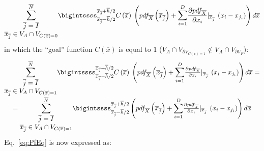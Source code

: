 \begin{equation}
\mathlarger{\sum}_{\begin{matrix}
\overline{j}=\overline{I} \\ \overline{x}_{\overline{j}} \in V_{A} \cap V_{C(\overline{x})=0} \end{matrix}}^{\overline{N}} 
\bigintssss_{\overline{x}_{\overline{j}} - \overline{h}/2}^{\overline{x}_{\overline{j}} + \overline{h}/2} C\left ( \overline{x} \right )\: 
\left ( pdf_{\overline{X}}\left ( \overline{x}_{\overline{j}} \right ) +
\mathlarger{\sum}_{i=1}^{D} \frac{\partial pdf_{\overline{X}}}{\partial x_{i}}|_{\overline{x}_{\overline{j}}} \: \left ( x_{i} - x_{j_{i}} \right ) \right )   d\overline{x}
\end{equation}
in which the  ``goal''  function $C(\overline{x})$ is equal to $1$ ($V_{A} \cap V_{\partial V_{C(\overline{x})=1}} \notin V_{A} \cap V_{\partial V_{F}}$):
\begin{equation}
\begin{matrix} 
\mathlarger{\sum}_{\begin{matrix}
\overline{j}=\overline{I} \\ \overline{x}_{\overline{j}} \in V_{A} \cap V_{C(\overline{x})=1} \end{matrix}}^{\overline{N}} 
\bigintssss_{\overline{x}_{\overline{j}} - \overline{h}/2}^{\overline{x}_{\overline{j}} + \overline{h}/2} C\left ( \overline{x} \right )\: 
\left ( pdf_{\overline{X}}\left ( \overline{x}_{\overline{j}} \right ) +
\mathlarger{\sum}_{i=1}^{D} \frac{\partial pdf_{\overline{X}}}{\partial x_{i}}|_{\overline{x}_{\overline{j}}} \: \left ( x_{i} - x_{j_{i}} \right ) \right )   d\overline{x} =
\\ 
= \mathlarger{\sum}_{\begin{matrix}
\overline{j}=\overline{I} \\ \overline{x}_{\overline{j}} \in V_{A} \cap V_{C(\overline{x})=1} \end{matrix}}^{\overline{N}} 
\bigintssss_{\overline{x}_{\overline{j}} - \overline{h}/2}^{\overline{x}_{\overline{j}} + \overline{h}/2}
\left ( pdf_{\overline{X}}\left ( \overline{x}_{\overline{j}} \right ) +
\mathlarger{\sum}_{i=1}^{D} \frac{\partial pdf_{\overline{X}}}{\partial x_{i}}|_{\overline{x}_{\overline{j}}} \: \left ( x_{i} - x_{j_{i}} \right ) \right )   d\overline{x}
\end{matrix}
\end{equation}
Eq.~\ref{eq:PfEq} is now expressed as:
